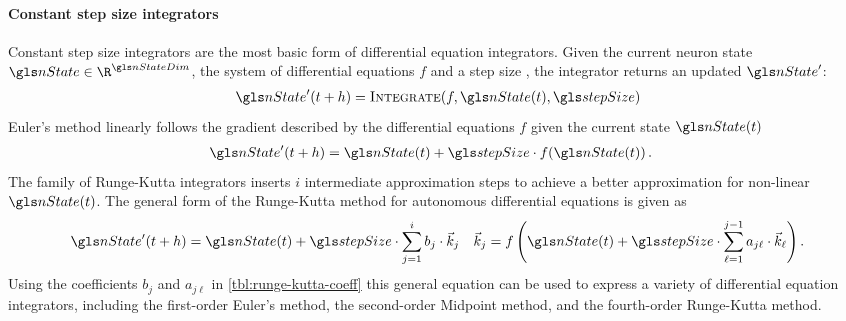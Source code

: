 \paragraph{Constant step size integrators}
Constant step size integrators are the most basic form of differential equation integrators. Given the current neuron state $\nState \in \R^{\nStateDim}$, the system of differential equations $f$ and a step size \stepSize, the integrator returns an updated $\nState'$:
\begin{align}
	\nState'(t + h) = \textsc{Integrate}(f, \nState(t), \stepSize)
\end{align}
Euler's method linearly follows the gradient described by the differential equations $f$ given the current state $\nState(t)$
\begin{align}
	\nState'(t + h) &= \nState(t) + \stepSize \cdot f(\nState(t)) \,.
\end{align}
The family of Runge-Kutta integrators inserts $i$ intermediate approximation steps to achieve a better approximation for non-linear $\nState(t)$. The general form of the Runge-Kutta method for autonomous differential equations is given as \cite{stoer2013introduction}
\begin{align}
	\nState'(t + h) &= \nState(t) + \stepSize \cdot \sum_{j = 1}^i b_j \cdot \vec k_j &
	\vec k_j = f\left(\nState(t) + \stepSize \cdot \sum_{\ell = 1}^{j - 1} a_{j\ell} \cdot \vec k_\ell\right).
\end{align}
Using the coefficients $b_j$ and $a_{j\ell}$ in \cref{tbl:runge-kutta-coeff} this general equation can be used to express a variety of differential equation integrators, including the first-order Euler's method, the second-order Midpoint method, and the fourth-order Runge-Kutta method.

